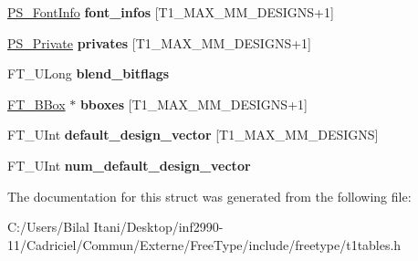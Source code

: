 \begin{DoxyCompactItemize}
\item 
\hyperlink{struct_p_s___font_info_rec__}{P\+S\+\_\+\+Font\+Info} {\bfseries font\+\_\+infos} \mbox{[}T1\+\_\+\+M\+A\+X\+\_\+\+M\+M\+\_\+\+D\+E\+S\+I\+G\+NS+1\mbox{]}\hypertarget{struct_p_s___blend_rec___ac5478cafc838257e693a9604edf1f5e9}{}\label{struct_p_s___blend_rec___ac5478cafc838257e693a9604edf1f5e9}

\item 
\hyperlink{struct_p_s___private_rec__}{P\+S\+\_\+\+Private} {\bfseries privates} \mbox{[}T1\+\_\+\+M\+A\+X\+\_\+\+M\+M\+\_\+\+D\+E\+S\+I\+G\+NS+1\mbox{]}\hypertarget{struct_p_s___blend_rec___a2b6e0c48d7a9c350b09f2943c1779ea4}{}\label{struct_p_s___blend_rec___a2b6e0c48d7a9c350b09f2943c1779ea4}

\item 
F\+T\+\_\+\+U\+Long {\bfseries blend\+\_\+bitflags}\hypertarget{struct_p_s___blend_rec___a86caa5319e208b4a2057db656bad9221}{}\label{struct_p_s___blend_rec___a86caa5319e208b4a2057db656bad9221}

\item 
\hyperlink{struct_f_t___b_box__}{F\+T\+\_\+\+B\+Box} $\ast$ {\bfseries bboxes} \mbox{[}T1\+\_\+\+M\+A\+X\+\_\+\+M\+M\+\_\+\+D\+E\+S\+I\+G\+NS+1\mbox{]}\hypertarget{struct_p_s___blend_rec___a30845d3cbd2e95a5f9cc867c7226af5e}{}\label{struct_p_s___blend_rec___a30845d3cbd2e95a5f9cc867c7226af5e}

\item 
F\+T\+\_\+\+U\+Int {\bfseries default\+\_\+design\+\_\+vector} \mbox{[}T1\+\_\+\+M\+A\+X\+\_\+\+M\+M\+\_\+\+D\+E\+S\+I\+G\+NS\mbox{]}\hypertarget{struct_p_s___blend_rec___a3ddacbda91fe0f9ef934a9e0afa6286f}{}\label{struct_p_s___blend_rec___a3ddacbda91fe0f9ef934a9e0afa6286f}

\item 
F\+T\+\_\+\+U\+Int {\bfseries num\+\_\+default\+\_\+design\+\_\+vector}\hypertarget{struct_p_s___blend_rec___afa5c7dd4206eb8a1d9ef4894abfc9555}{}\label{struct_p_s___blend_rec___afa5c7dd4206eb8a1d9ef4894abfc9555}

\end{DoxyCompactItemize}


The documentation for this struct was generated from the following file\+:\begin{DoxyCompactItemize}
\item 
C\+:/\+Users/\+Bilal Itani/\+Desktop/inf2990-\/11/\+Cadriciel/\+Commun/\+Externe/\+Free\+Type/include/freetype/t1tables.\+h\end{DoxyCompactItemize}
